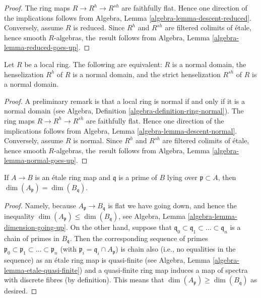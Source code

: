 \begin{proof}
The ring maps $R \to R^h \to R^{sh}$ are faithfully flat.
Hence one direction of the implications follows from
Algebra, Lemma \ref{algebra-lemma-descent-reduced}.
Conversely, assume $R$ is reduced. Since $R^h$ and $R^{sh}$
are filtered colimits of \'etale, hence smooth $R$-algebras, the\
result follows from
Algebra, Lemma \ref{algebra-lemma-reduced-goes-up}.
\end{proof}

\begin{lemma}
\label{lemma-henselization-normal}
Let $R$ be a local ring.
The following are equivalent: $R$ is a normal domain,
the henselization $R^h$ of $R$ is a normal domain, and
the strict henselization $R^{sh}$ of $R$ is a normal domain.
\end{lemma}

\begin{proof}
A preliminary remark is that a local ring is normal if and only if it is
a normal domain (see
Algebra, Definition \ref{algebra-definition-ring-normal}).
The ring maps $R \to R^h \to R^{sh}$ are faithfully flat.
Hence one direction of the implications follows from
Algebra, Lemma \ref{algebra-lemma-descent-normal}.
Conversely, assume $R$ is normal. Since $R^h$ and $R^{sh}$
are filtered colimits of \'etale, hence smooth $R$-algebras, the\
result follows from
Algebra, Lemma \ref{algebra-lemma-normal-goes-up}.
\end{proof}

\begin{lemma}
\label{lemma-dimension-etale-extension}
If $A \to B$ is an \'etale ring map and $\mathfrak q$ is a prime of
$B$ lying over $\mathfrak p \subset A$, then
$\dim(A_{\mathfrak p}) = \dim(B_{\mathfrak q})$.
\end{lemma}

\begin{proof}
Namely, because $A_{\mathfrak p} \to B_{\mathfrak q}$ is flat we have
going down, and hence the inequality
$\dim(A_{\mathfrak p}) \leq \dim(B_{\mathfrak q})$, see
Algebra, Lemma \ref{algebra-lemma-dimension-going-up}.
On the other hand, suppose that
$\mathfrak q_0 \subset \mathfrak q_1 \subset \ldots \subset \mathfrak q_n$
is a chain of primes in $B_{\mathfrak q}$. Then the corresponding
sequence of primes
$\mathfrak p_0 \subset \mathfrak p_1 \subset \ldots \subset \mathfrak p_n$
(with $\mathfrak p_i = \mathfrak q_i \cap A_{\mathfrak p}$) is chain
also (i.e., no equalities in the sequence) as an
\'etale ring map is quasi-finite (see
Algebra, Lemma \ref{algebra-lemma-etale-quasi-finite})
and a quasi-finite ring map induces a map of spectra with
discrete fibres (by definition).
This means that $\dim(A_{\mathfrak p}) \geq \dim(B_{\mathfrak q})$ as
desired.
\end{proof}

